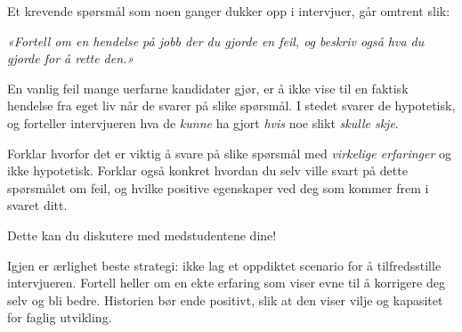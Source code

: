 

Et krevende spørsmål som noen ganger dukker opp i intervjuer, går omtrent slik:

\vskip 10pt {\narrower \noindent \baselineskip5pt

{\it «Fortell om en hendelse på jobb der du gjorde en feil, og beskriv også hva du gjorde for å rette den.»}

\par} \vskip 10pt

En vanlig feil mange uerfarne kandidater gjør, er å ikke vise til en faktisk hendelse fra eget liv når de svarer på slike spørsmål. I stedet svarer de hypotetisk, og forteller intervjueren hva de {\it kunne} ha gjort {\it hvis} noe slikt {\it skulle skje}.

Forklar hvorfor det er viktig å svare på slike spørsmål med {\it virkelige erfaringer} og ikke hypotetisk. Forklar også konkret hvordan du selv ville svart på dette spørsmålet om feil, og hvilke positive egenskaper ved deg som kommer frem i svaret ditt.

\vskip 50pt







Dette kan du diskutere med medstudentene dine!







Igjen er ærlighet beste strategi: ikke lag et oppdiktet scenario for å tilfredsstille intervjueren. Fortell heller om en ekte erfaring som viser evne til å korrigere deg selv og bli bedre. Historien bør ende positivt, slik at den viser vilje og kapasitet for faglig utvikling.




